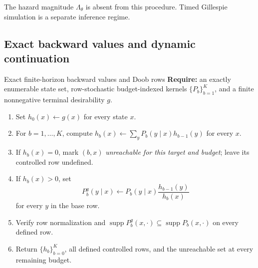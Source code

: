 The hazard magnitude $\Lambda_\theta$ is absent from this procedure.  Timed
Gillespie simulation is a separate inference regime.

\subsection{Exact backward values and dynamic continuation}
\label{sec:app-compose-control-algorithms}

\begin{composeappendixalgorithm}{Exact finite-horizon backward values and Doob rows}
\label{alg:app-compose-doob}
\textbf{Require:} an exactly enumerable state set, row-stochastic
budget-indexed kernels $\{P_b\}_{b=1}^K$, and a finite nonnegative terminal
desirability $g$.
\begin{enumerate}[
  leftmargin=2.45em,
  label=\arabic*:,
  topsep=0.25em,
  itemsep=0.12em,
  parsep=0pt
]
  \item Set $h_0(x)\leftarrow g(x)$ for every state $x$.
  \item For $b=1,\ldots,K$, compute
  $h_b(x)\leftarrow\sum_yP_b(y\mid x)h_{b-1}(y)$ for every $x$.
  \item If $h_b(x)=0$, mark $(b,x)$ \emph{unreachable for this target and
  budget}; leave its controlled row undefined.
  \item If $h_b(x)>0$, set
  \[
    P_b^g(y\mid x)
    \leftarrow
    P_b(y\mid x)\frac{h_{b-1}(y)}{h_b(x)}
  \]
  for every $y$ in the base row.
  \item Verify row normalization and
  $\operatorname{supp}P_b^g(x,\cdot)
  \subseteq\operatorname{supp}P_b(x,\cdot)$ on every defined row.
  \item Return $\{h_b\}_{b=0}^K$, all defined controlled rows, and the
  unreachable set at every remaining budget.
\end{enumerate}
\end{composeappendixalgorithm}

